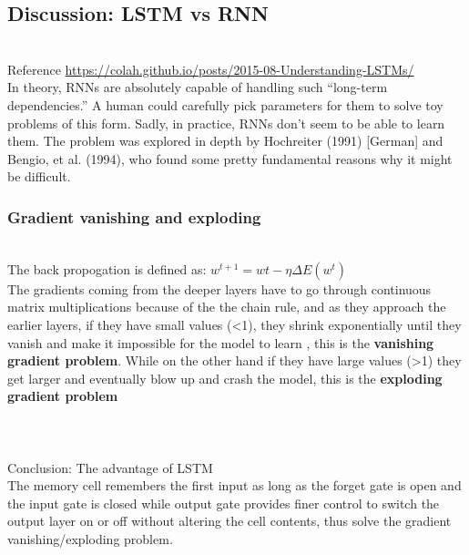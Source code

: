 \documentclass[11pt, a4paper]{article} %
\begin{document}
\subsection{Discussion: LSTM vs RNN}
\\ Reference \url{https://colah.github.io/posts/2015-08-Understanding-LSTMs/}
\\ In theory, RNNs are absolutely capable of handling such “long-term dependencies.” A human could carefully pick parameters for them to solve toy problems of this form. Sadly, in practice, RNNs don’t seem to be able to learn them. The problem was explored in depth by Hochreiter (1991) [German] and Bengio, et al. (1994), who found some pretty fundamental reasons why it might be difficult.
\subsubsection{Gradient vanishing and exploding}
\\ The back propogation is defined as: $w^{t+1} = w{t} - \eta\Delta E(w^{t})$ 
\\ The gradients coming from the deeper layers have to go through continuous matrix multiplications because of the the chain rule, and as they approach the earlier layers, if they have small values (<1), they shrink exponentially until they vanish and make it impossible for the model to learn , this is the \textbf{vanishing gradient problem}. While on the other hand if they have large values (>1) they get larger and eventually blow up and crash the model, this is the \textbf{exploding gradient problem}
\\
\\
\\
\\ {\Large Conclusion: The advantage of LSTM}
\\ The memory cell remembers the first input as long as the forget gate is open and the input gate is closed while output gate provides finer control to switch the output layer on or off without altering the cell contents, thus solve the gradient vanishing/exploding problem.
\end{document}
